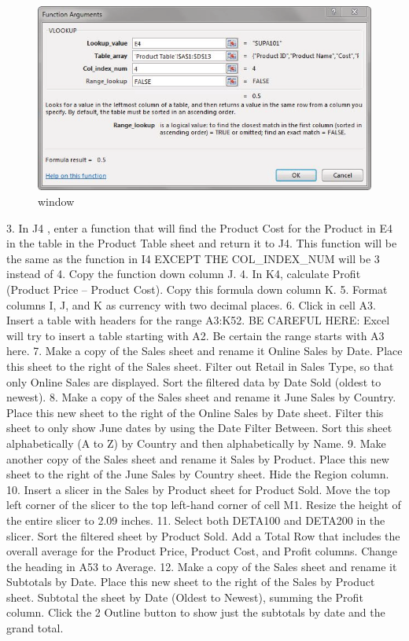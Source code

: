 \begin{figure}[H]
	\centering
	\includegraphics[width=\maxwidth{.95\linewidth}]{gfx/ch05_fig32}
	\caption{ window}
	\label{05:fig32}
\end{figure}






3. In J4 , enter a  function that will find the Product Cost for the Product in E4 in the
table in the Product Table sheet and return it to J4. This  function will be the same as
the  function in I4 EXCEPT THE COL\_INDEX\_NUM will be 3 instead of 4. Copy
the function down column J.
4. In K4, calculate Profit (Product Price – Product Cost). Copy this formula down column K.
5. Format columns I, J, and K as currency with two decimal places.
6. Click in cell A3. Insert a table with headers for the range A3:K52. BE CAREFUL HERE: Excel will try to insert a table starting with A2. Be certain the range starts with A3 here.
7. Make a copy of the Sales sheet and rename it Online Sales by Date. Place this sheet to the right
of the Sales sheet. Filter out Retail in Sales Type, so that only Online Sales are displayed. Sort the
filtered data by Date Sold (oldest to newest).
8. Make a copy of the Sales sheet and rename it June Sales by Country. Place this new sheet to the
right of the Online Sales by Date sheet. Filter this sheet to only show June dates by using the
Date Filter Between. Sort this sheet alphabetically (A to Z) by Country and then alphabetically
by Name.
9. Make another copy of the Sales sheet and rename it Sales by Product. Place this new sheet to
the right of the June Sales by Country sheet. Hide the Region column.
10. Insert a slicer in the Sales by Product sheet for Product Sold. Move the top left corner of the
slicer to the top left-hand corner of cell M1. Resize the height of the entire slicer to 2.09 inches.
11. Select both DETA100 and DETA200 in the slicer. Sort the filtered sheet by Product Sold. Add a
Total Row that includes the overall average for the Product Price, Product Cost, and Profit
columns. Change the heading in A53 to Average.
12. Make a copy of the Sales sheet and rename it Subtotals by Date. Place this new sheet to the
right of the Sales by Product sheet. Subtotal the sheet by Date (Oldest to Newest), summing the
Profit column. Click the 2 Outline button to show just the subtotals by date and the grand total.


